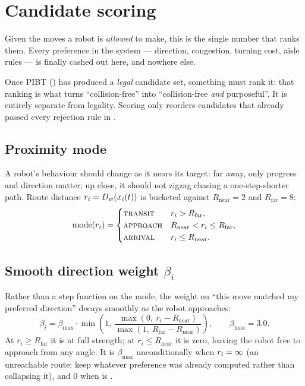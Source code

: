 \section{Candidate scoring}
\label{sec:scoring}

\begin{lede}
Given the moves a robot is \emph{allowed} to make, this is the single number
that ranks them. Every preference in the system --- direction, congestion,
turning cost, aisle rules --- is finally cashed out here, and nowhere else.
\end{lede}

Once PIBT () has produced a \emph{legal} candidate set, something
must rank it: that ranking is what turns ``collision-free'' into
``collision-free \emph{and} purposeful''. It is entirely separate from
legality. Scoring only reorders candidates that already passed every rejection
rule in .

\subsection{Proximity mode}
\label{sec:score-mode}

A robot's behaviour should change as it nears its target: far away, only
progress and direction matter; up close, it should not zigzag chasing a
one-step-shorter path. Route distance $r_i = D_{w}(x_{i}(t))$ is bucketed
against $R_{\mathrm{near}} = 2$ and $R_{\mathrm{far}} = 8$:
\begin{equation}
  \mathrm{mode}(r_i) =
  \begin{cases}
    \textsc{transit} & r_i > R_{\mathrm{far}},\\
    \textsc{approach} & R_{\mathrm{near}} < r_i \leq R_{\mathrm{far}},\\
    \textsc{arrival} & r_i \leq R_{\mathrm{near}}.
  \end{cases}
\end{equation}

\subsection{Smooth direction weight \texorpdfstring{$\beta_i$}{beta}}
\label{sec:score-beta}

Rather than a step function on the mode, the weight on ``this move matched my
preferred direction'' decays smoothly as the robot approaches:
\begin{equation}
  \beta_i = \beta_{\max} \cdot
    \min\!\left(1,\ \frac{\max(0,\ r_i - R_{\mathrm{near}})}
      {\max(1,\ R_{\mathrm{far}} - R_{\mathrm{near}})}\right),
  \qquad \beta_{\max} = 3.0.
\end{equation}
At $r_i \geq R_{\mathrm{far}}$ it is at full strength; at
$r_i \leq R_{\mathrm{near}}$ it is zero, leaving the robot free to approach
from any angle. It is $\beta_{\max}$ unconditionally when $r_i = \infty$ (an
unreachable route: keep whatever preference was already computed rather than
collapsing it), and $0$ when  is .

